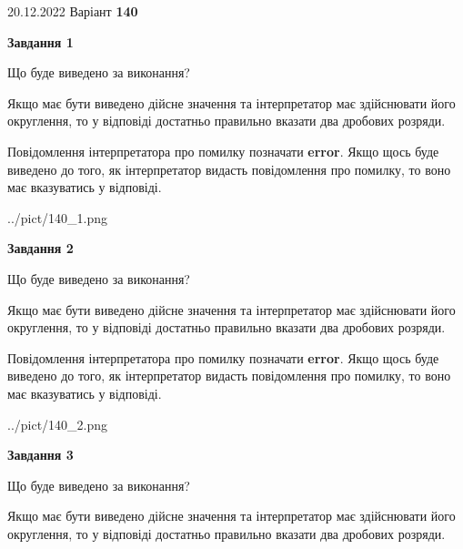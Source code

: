\documentclass[12pt, ukrainian]{article}
\begin{document}
{20.12.2022 Варіант \No \textbf { 140 }\par}
{
\begin {Large}

{\begin {center}\textbf{Завдання 1}\end {center}}\par
Що буде виведено за виконання? \par

Якщо має бути виведено дійсне значення та інтерпретатор має здійснювати його округлення, 
то у відповіді достатньо правильно вказати два дробових розряди.

Повідомлення інтерпретатора про помилку позначати \textbf{error}.
Якщо щось буде виведено до того, як інтерпретатор видасть повідомлення про помилку, 
то воно має вказуватись у відповіді. \par

\begin{center}
	{../pict/140_1.png}
\end{center}
\newpage

{\begin {center}\textbf{Завдання 2}\end {center}}\par
Що буде виведено за виконання? \par

Якщо має бути виведено дійсне значення та інтерпретатор має здійснювати його округлення, 
то у відповіді достатньо правильно вказати два дробових розряди.

Повідомлення інтерпретатора про помилку позначати \textbf{error}.
Якщо щось буде виведено до того, як інтерпретатор видасть повідомлення про помилку, 
то воно має вказуватись у відповіді. \par

\begin{center}
	{../pict/140_2.png}
\end{center}
\newpage

{\begin {center}\textbf{Завдання 3}\end {center}}\par
Що буде виведено за виконання? \par

Якщо має бути виведено дійсне значення та інтерпретатор має здійснювати його округлення, 
то у відповіді достатньо правильно вказати два дробових розряди.


\end{Large}}
\end{document}
